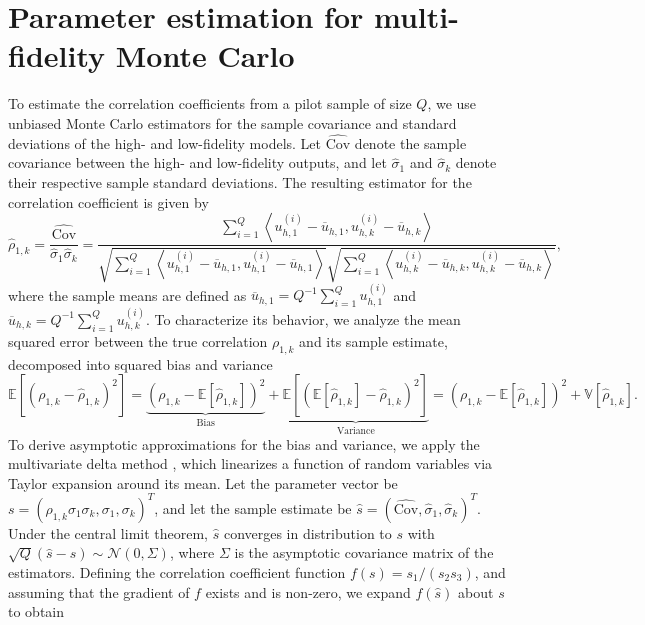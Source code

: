\section{Parameter estimation for multi-fidelity Monte Carlo}\label{sec:Parameter_Estimation}

To estimate the correlation coefficients from a pilot sample of size $Q$, we use unbiased Monte Carlo estimators for the sample covariance and standard deviations of the high- and low-fidelity models. Let $\widehat{\text{Cov}}$ denote the sample covariance between the high- and low-fidelity outputs, and let $\widehat\sigma_1$ and $\widehat\sigma_k$ denote their respective sample standard deviations. The resulting estimator for the correlation coefficient is given by
%
\[
\widehat\rho_{1,k} = \frac{\widehat{\text{Cov}}}{\widehat\sigma_1 \widehat\sigma_k} = \frac{\sum_{i=1}^Q\left\langle u_{h,1}^{(i)} - \overline{u}_{h,1},  u_{h,k}^{(i)} - \overline{u}_{h,k} \right\rangle}{\sqrt{\sum_{i=1}^Q \left\langle u_{h,1}^{(i)} - \overline{u}_{h,1}, u_{h,1}^{(i)} - \overline{u}_{h,1} \right\rangle} \sqrt{\sum_{i=1}^Q \left\langle u_{h,k}^{(i)} - \overline{ u}_{h,k}, u_{h,k}^{(i)} - \overline{u}_{h,k} \right\rangle}},
\]
%
where the sample means are defined as $\overline{u}_{h,1} = Q^{-1}\sum_{i=1}^Q u_{h,1}^{(i)}$ and $\overline{  u}_{h,k} = Q^{-1}\sum_{i=1}^Q u_{h,k}^{(i)}$.  To characterize its behavior, we analyze the mean squared error between the true correlation $\rho_{1,k}$ and its sample estimate, decomposed into squared bias and variance
%
\begin{equation}
\label{eq:MSE_rho}
    \mathbb{E}\left[\left(\rho_{1,k} - \widehat\rho_{1,k}\right)^2\right]= \underbrace{\left(\rho_{1,k} - \mathbb{E}\left[\widehat\rho_{1,k}\right]\right)^2}_{\text{Bias}}+\underbrace{\mathbb{E}\left[\left( \mathbb{E}\left[\widehat\rho_{1,k}\right]-\widehat\rho_{1,k}\right)^2\right]}_{\text{Variance}}=\left(\rho_{1,k} - \mathbb{E}\left[\widehat\rho_{1,k}\right]\right)^2+\mathbb{V}\left[\widehat\rho_{1,k}\right].
\end{equation}
%
To derive asymptotic approximations for the bias and variance, we apply the multivariate delta method \cite{Cr:1946,Oe:1992}, which linearizes a function of random variables via Taylor expansion around its mean. Let the parameter vector be $s = (\rho_{1,k}\sigma_1\sigma_k, \sigma_1, \sigma_k)^T$, and let the sample estimate be $\widehat s = (\widehat{\text{Cov}}, \widehat\sigma_1, \widehat\sigma_k)^T$. Under the central limit theorem, $\widehat s$ converges in distribution to $s$ with $\sqrt{Q}(\widehat s-s)\sim \mathcal{N}(0,\Sigma)$, where $\Sigma$ is the asymptotic covariance matrix of the estimators. Defining the correlation coefficient function $f(s) = s_1 / (s_2 s_3)$, and assuming that the gradient of $f$ exists and is non-zero, we expand $f(\widehat s)$ about $s$ to obtain
